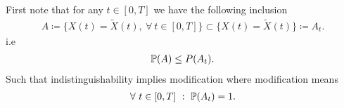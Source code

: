 \begin{example}
  First note that for any $t \in  [0,T]$  we have the following inclusion 
  \begin{align*}
    A \coloneqq \{X(t)=\tilde{X}(t) ,\ \forall \ t \in  [0,T] \}  \subset  \{X(t) = \tilde{X}(t) \} \coloneqq  A_t   
  .\end{align*}
  i.e 
  \begin{align*}
   \P(A) \le  P(A_t) 
  .\end{align*}
  Such that indistinguishability implies modification where modification means 
  \begin{align*}
    \forall \ t  \in  [0,T] \ : \ \P(A_t) = 1
  .\end{align*}
\end{example}

